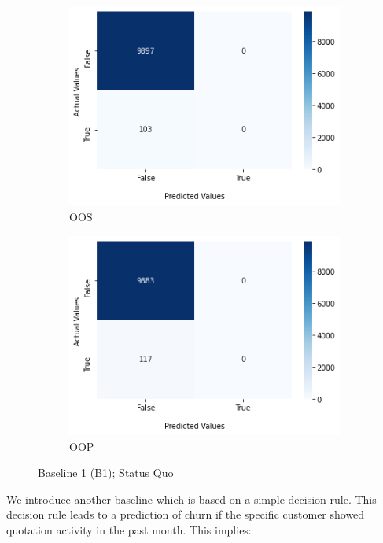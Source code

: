 \documentclass[12pt,titlepage]{article}
\begin{document}
\begin{figure}[H]
\centering
\begin{subfigure}{.5\textwidth}
  \centering
  \includegraphics[width=1\linewidth]{conf_b1_oos.png}
  \caption{OOS}
  \label{fig:conf_b1_oos}
\end{subfigure}%
\begin{subfigure}{.5\textwidth}
  \centering
  \includegraphics[width=1\linewidth]{conf_b1_oop.png}
  \caption{OOP}
  \label{fig:conf_b1_oop}
\end{subfigure}
\caption{Baseline 1 (B1); Status Quo}
\label{fig:b1}
\end{figure}
\vspace{5mm}
We introduce another baseline which is based on a simple decision rule. This decision rule leads to a prediction of churn if the specific customer showed quotation activity in the past month. This implies: \\
\end{document}
